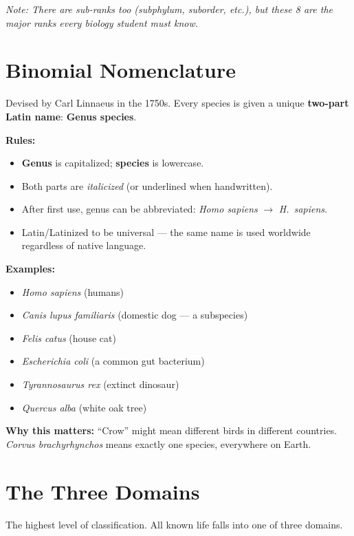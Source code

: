 \documentclass[11pt, letterpaper]{article}
\begin{document}
\textit{Note: There are sub-ranks too (subphylum, suborder, etc.), but these 8 are the major ranks every biology student must know.}

\section*{Binomial Nomenclature}

Devised by Carl Linnaeus in the 1750s. Every species is given a unique \textbf{two-part Latin name}: \textbf{Genus species}.

\textbf{Rules:}
\begin{itemize}[noitemsep]
  \item \textbf{Genus} is capitalized; \textbf{species} is lowercase.
  \item Both parts are \emph{italicized} (or underlined when handwritten).
  \item After first use, genus can be abbreviated: \textit{Homo sapiens} $\to$ \textit{H.\ sapiens}.
  \item Latin/Latinized to be universal --- the same name is used worldwide regardless of native language.
\end{itemize}

\textbf{Examples:}
\begin{itemize}[noitemsep]
  \item \textit{Homo sapiens} (humans)
  \item \textit{Canis lupus familiaris} (domestic dog --- a subspecies)
  \item \textit{Felis catus} (house cat)
  \item \textit{Escherichia coli} (a common gut bacterium)
  \item \textit{Tyrannosaurus rex} (extinct dinosaur)
  \item \textit{Quercus alba} (white oak tree)
\end{itemize}

\textbf{Why this matters:} ``Crow'' might mean different birds in different countries. \textit{Corvus brachyrhynchos} means exactly one species, everywhere on Earth.

\section*{The Three Domains}

The highest level of classification. All known life falls into one of three domains.
\end{document}
